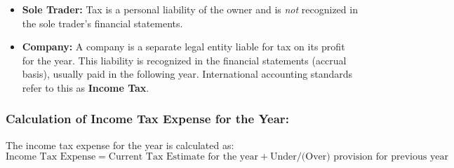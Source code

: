 \begin{itemize}
    \item \textbf{Sole Trader:} Tax is a personal liability of the owner and is \textit{not} recognized in the sole trader's financial statements.
    \item \textbf{Company:} A company is a separate legal entity liable for tax on its profit for the year. This liability is recognized in the financial statements (accrual basis), usually paid in the following year. International accounting standards refer to this as \textbf{Income Tax}.
\end{itemize}

\subsubsection*{Calculation of Income Tax Expense for the Year:}

The income tax expense for the year is calculated as:
$$
\text{Income Tax Expense} = \text{Current Tax Estimate for the year} + \text{Under/(Over) provision for previous year}
$$

